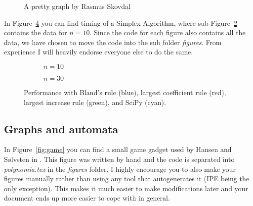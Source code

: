 \documentclass[a4, english]{article}
\begin{document}
\begin{figure}[ht!]
  \centering


  \caption{A pretty graph by Rasmus Skovdal}
  \label{fig:calc_graph}
\end{figure}

In Figure~\ref{fig:simplex} you can find timing of a Simplex Algorithm, where
sub Figure~\ref{fig:simplex_10} contains the data for $n = 10$. Since the code
for each figure also contains all the data, we have chosen to move the code into
the sub folder \emph{figures}. From experience I will heavily endorse everyone
else to do the same.
\begin{figure}[ht!]
  \centering
  \begin{subfigure}{.48\linewidth}
    \centering
    
    \caption{$n = 10$}
    \label{fig:simplex_10}
  \end{subfigure}
  \begin{subfigure}{.48\linewidth}
    \centering
    
    \caption{$n = 30$}
    \label{fig:simplex_30}
  \end{subfigure}

  \caption{Performance with Bland's rule (blue), largest coefficient rule (red),
    largest increase rule (green), and SciPy (cyan).}
  \label{fig:simplex}
\end{figure}

\subsection{Graphs and automata}
In Figure~\ref{fig:game} you can find a small game gadget used by Hansen and
Sølvsten in \cite{hansen2020}. This figure was written by hand and the code is
separated into \emph{polynomia.tex} in the \emph{figures} folder. I highly
encourage you to also make your figures manually rather than using any tool that
autogenerates it (IPE being the only exception). This makes it much easier
to make modifications later and your document ends up more easier to cope with
in general.
\end{document}
